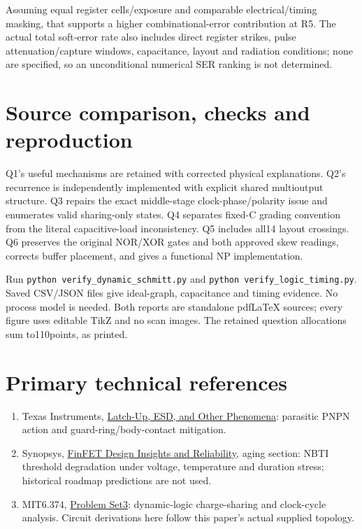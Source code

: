 \documentclass[10pt]{article}
\begin{document}
Assuming equal register cells/exposure and comparable electrical/timing masking, that supports a higher combinational-error contribution at R5. The actual total soft-error rate also includes direct register strikes, pulse attenuation/capture windows, capacitance, layout and radiation conditions; none are specified, so an unconditional numerical SER ranking is not determined.

\section*{Source comparison, checks and reproduction}
Q1's useful mechanisms are retained with corrected physical explanations. Q2's recurrence is independently implemented with explicit shared multioutput structure. Q3 repairs the exact middle-stage clock-phase/polarity issue and enumerates valid sharing-only states. Q4 separates fixed-C grading convention from the literal capacitive-load inconsistency. Q5 includes all14 layout crossings. Q6 preserves the original NOR/XOR gates and both approved skew readings, corrects buffer placement, and gives a functional NP implementation.

Run \texttt{python verify\_dynamic\_schmitt.py} and \texttt{python verify\_logic\_timing.py}. Saved CSV/JSON files give ideal-graph, capacitance and timing evidence. No process model is needed. Both reports are standalone pdfLaTeX sources; every figure uses editable TikZ and no scan images. The retained question allocations sum to110points, as printed.

\section*{Primary technical references}
\begin{enumerate}[leftmargin=7mm,itemsep=4pt]
\item Texas Instruments, \href{https://www.ti.com/lit/pdf/slya014}{Latch-Up, ESD, and Other Phenomena}: parasitic PNPN action and guard-ring/body-contact mitigation.
\item Synopsys, \href{https://www.synopsys.com/articles/finfet-design.html}{FinFET Design Insights and Reliability}, aging section: NBTI threshold degradation under voltage, temperature and duration stress; historical roadmap predictions are not used.
\item MIT6.374, \href{https://ocw.mit.edu/courses/6-374-analysis-and-design-of-digital-integrated-circuits-fall-2003/b4b0ba298ce3c93e19f24215304850c5_ps3_03.pdf}{Problem Set3}: dynamic-logic charge-sharing and clock-cycle analysis. Circuit derivations here follow this paper's actual supplied topology.
\end{enumerate}
\end{document}
